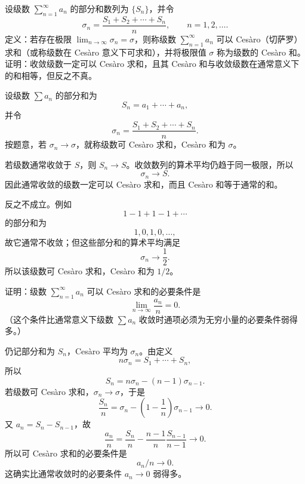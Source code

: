 \begin{xreferenceproblem}[18]
设级数 $\sum_{n=1}^{\infty}a_n$ 的部分和数列为 $\{S_n\}$，并令
\[
\sigma_n=\frac{S_1+S_2+\cdots+S_n}{n},\qquad n=1,2,\ldots.
\]
定义：若存在极限 $\lim_{n\to\infty}\sigma_n=\sigma$，则称级数 $\sum_{n=1}^{\infty}a_n$ 可以 Cesàro（切萨罗）求和（或称级数在 Cesàro 意义下可求和），并将极限值 $\sigma$ 称为级数的 Cesàro 和。证明：收敛级数一定可以 Cesàro 求和，且其 Cesàro 和与收敛级数在通常意义下的和相等，但反之不真。
\end{xreferenceproblem}
\begin{xsolution}
设级数 $\sum a_n$ 的部分和为
\[
 S_n=a_1+\cdots+a_n,
\]
并令
\[
 \sigma_n=\frac{S_1+S_2+\cdots+S_n}{n}.
\]
按题意，若 $\sigma_n\to\sigma$，就称级数可 Cesàro 求和，Cesàro 和为 $\sigma$。

若级数通常收敛于 $S$，则 $S_n\to S$。收敛数列的算术平均仍趋于同一极限，所以
\[
 \sigma_n\to S.
\]
因此通常收敛的级数一定可以 Cesàro 求和，而且 Cesàro 和等于通常的和。

反之不成立。例如
\[
 1-1+1-1+\cdots
\]
的部分和为
\[
 1,0,1,0,\ldots,
\]
故它通常不收敛；但这些部分和的算术平均满足
\[
 \sigma_n\longrightarrow\frac12.
\]
所以该级数可 Cesàro 求和，Cesàro 和为 $1/2$。
\end{xsolution}


\begin{xreferenceproblem}[19]
证明：级数 $\sum_{n=1}^{\infty}a_n$ 可以 Cesàro 求和的必要条件是
\[
\lim_{n\to\infty}\frac{a_n}{n}=0.
\]
（这个条件比通常意义下级数 $\sum a_n$ 收敛时通项必须为无穷小量的必要条件弱得多。）
\end{xreferenceproblem}
\begin{xsolution}
仍记部分和为 $S_n$，Cesàro 平均为 $\sigma_n$。由定义
\[
 n\sigma_n=S_1+\cdots+S_n,
\]
所以
\[
 S_n=n\sigma_n-(n-1)\sigma_{n-1}.
\]
若级数可 Cesàro 求和，$\sigma_n\to\sigma$，于是
\[
 \frac{S_n}{n}
 =\sigma_n-\left(1-\frac1n\right)\sigma_{n-1}\longrightarrow0.
\]
又 $a_n=S_n-S_{n-1}$，故
\[
 \frac{a_n}{n}
 =\frac{S_n}{n}-\frac{n-1}{n}\frac{S_{n-1}}{n-1}\longrightarrow0.
\]
所以可 Cesàro 求和的必要条件是
\[
 \boxed{a_n/n\to0}.
\]
这确实比通常收敛时的必要条件 $a_n\to0$ 弱得多。
\end{xsolution}


